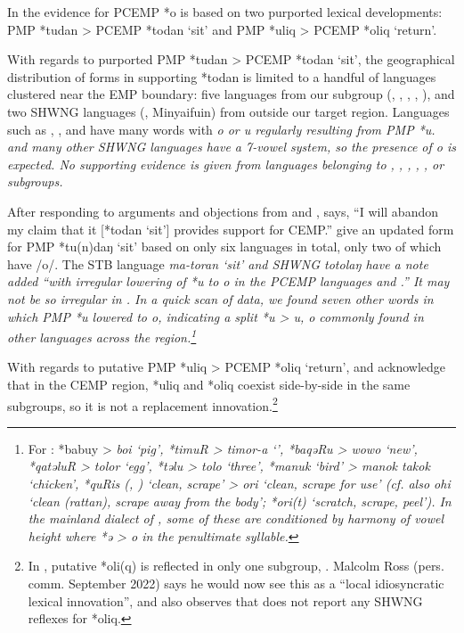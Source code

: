 In \citet[247--249]{Blust1993} the evidence for PCEMP *o is based on
two purported lexical developments: PMP *tudan > PCEMP *todan
‘sit’ and PMP *uliq > PCEMP *oliq ‘return’.

With regards to purported PMP *tudan > PCEMP *todan ‘sit’,
the geographical distribution of forms in \citet{Blust1993} supporting
*todan is limited to a handful of languages clustered near the
EMP boundary: five languages from our 
subgroup (, , , , ),
and two SHWNG languages (,
Minyaifuin) from outside our target region.
Languages such as ,
, and  have many words with \it{o} or \it{u} regularly
resulting from PMP *u.
 and many other SHWNG languages have a 7-vowel system,
so the presence of \it{o} is expected.
No supporting evidence is given from languages belonging to ,
, , ,
, or  subgroups.

After responding to arguments
and objections from \citet{Nothofer1992}
and \citet{DonohueGrimes2008},
\citet[57]{Blust2009} says, “I will abandon my claim that it
[*todan ‘sit’] provides support for CEMP.” \citet{BlustTrussel2020}
give an updated form for PMP *tu(n)daŋ ‘sit’ based on only six
languages in total, only two of which have /o/.
The STB language  \it{ma-toran} ‘sit’
and SHWNG  \it{totolaŋ} have a note added “with irregular
lowering of *u to \it{o} in the PCEMP languages 
and .” It may not be so irregular in .
In a quick scan of  data,
we found seven other words in which PMP *u lowered to \it{o},
indicating a split *u > \it{u,
o} commonly found in other languages across the region.\footnote{
		For
		: *babuy > \it{boi} ‘pig’,
		*timuR > \it{timor-a} ‘’,
		*baqəRu > \it{wowo} ‘new’,
		*qatəluR > \it{tolor} ‘egg’,
		*təlu > \it{tolo} ‘three’,
		*manuk ‘bird’ > \it{manok takok} ‘chicken’,
		*quRis (, \citealp{ZorcCharles1971}) ‘clean,
		scrape’ > \it{ori} ‘clean,
		scrape for use’ (cf.
		also  \it{ohi} ‘clean (rattan),
		scrape away from the body’;  *ori(t) ‘scratch, scrape, peel’).
		In the mainland  dialect of ,
		some of these are conditioned by harmony of vowel height where
		*ə > \it{o} in the penultimate syllable.}

With regards to putative PMP *uliq > PCEMP *oliq ‘return’,
\citet{Blust2009} and \citet{BlustTrussel2020} acknowledge
that in the CEMP region,
*uliq and *oliq coexist side-by-side in the same subgroups,
so it is not a replacement innovation.\footnote{
In \citet[410f]{Ross2016},
putative  *oli(q) is reflected in only one subgroup,
. Malcolm Ross (pers. comm.
September 2022) says he would now see this as a “local idiosyncratic
lexical innovation”, and also observes that \citet{Kamholz2014} does not report any
SHWNG reflexes for *oliq.}

